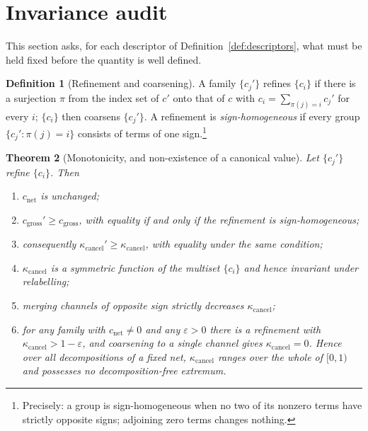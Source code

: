 \documentclass[11pt]{article}
\newtheorem{theorem}{Theorem}[section]
\theoremstyle{definition}
\newtheorem{definition}[theorem]{Definition}
\theoremstyle{remark}
\newcommand{\net}{c_{\mathrm{net}}}
\newcommand{\gross}{c_{\mathrm{gross}}}
\newcommand{\kcancel}{\kappa_{\mathrm{cancel}}}
\begin{document}
\section{Invariance audit}
\label{sec:audit}

This section asks, for each descriptor of Definition~\ref{def:descriptors}, what must be held
fixed before the quantity is well defined.

\begin{definition}[Refinement and coarsening]
\label{def:refinement}
A family $\{c_j'\}$ refines $\{c_i\}$ if there is a surjection $\pi$ from the index set of $c'$ onto
that of $c$ with $c_i = \sum_{\pi(j)=i} c_j'$ for every $i$; $\{c_i\}$ then coarsens $\{c_j'\}$. A
refinement is \emph{sign-homogeneous} if every group $\{c_j' : \pi(j)=i\}$ consists of terms of one
sign.\footnote{Precisely: a group is sign-homogeneous when no two of its nonzero terms have
strictly opposite signs; adjoining zero terms changes nothing.}
\end{definition}

\begin{theorem}[Monotonicity, and non-existence of a canonical value]
\label{thm:monotonicity}
Let $\{c_j'\}$ refine $\{c_i\}$. Then
\begin{enumerate}
\item[(i)] $\net$ is unchanged;
\item[(ii)] $\gross' \ge \gross$, with equality if and only if the refinement is sign-homogeneous;
\item[(iii)] consequently $\kcancel' \ge \kcancel$, with equality under the same condition;
\item[(iv)] $\kcancel$ is a symmetric function of the multiset $\{c_i\}$ and hence invariant under
relabelling;
\item[(v)] merging channels of opposite sign strictly decreases $\kcancel$;
\item[(vi)] for any family with $\net \ne 0$ and any $\varepsilon>0$ there is a refinement with
$\kcancel > 1-\varepsilon$, and coarsening to a single channel gives $\kcancel = 0$. Hence over all
decompositions of a fixed net, $\kcancel$ ranges over the whole of $[0,1)$ and possesses no
decomposition-free extremum.
\end{enumerate}
\end{theorem}
\end{document}
